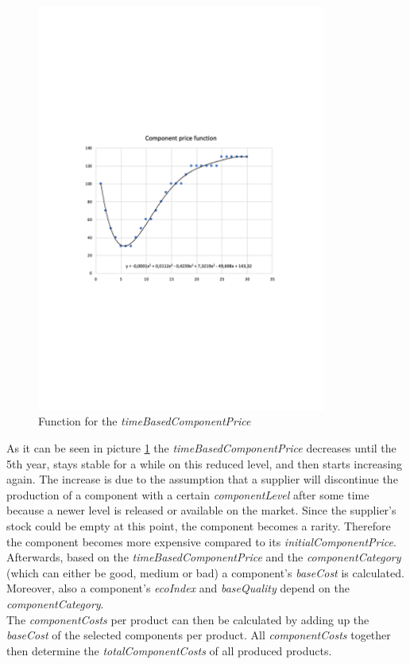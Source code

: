 \begin{figure}
    \centering
	\includegraphics[width=9.5cm]{images/timeBasedComponentPriceFunction.pdf}
	\caption{Function for the \textit{timeBasedComponentPrice}}
	\label{img:timeBasedComponentPriceFunction}
\end{figure}
As it can be seen in picture \ref{img:timeBasedComponentPriceFunction} the \textit{timeBasedComponentPrice} decreases until the 5th year, stays stable for a while on this reduced level, and then starts increasing again. The increase is due to the assumption that a supplier will discontinue the production of a component with a certain \textit{componentLevel} after some time because a newer level is released or available on the market. Since the supplier’s stock could be empty at this point, the component becomes a rarity. Therefore the component becomes more expensive compared to its \textit{initialComponentPrice}.\\
Afterwards, based on the \textit{timeBasedComponentPrice} and the \textit{componentCategory} (which can either be good, medium or bad) a component's \textit{baseCost} is calculated. Moreover, also a component's \textit{ecoIndex} and \textit{baseQuality} depend on the \textit{componentCategory}.\\
The \textit{componentCosts} per product can then be calculated by adding up the \textit{baseCost} of the selected components per product. All \textit{componentCosts} together then determine the \textit{totalComponentCosts} of all produced products.\\

